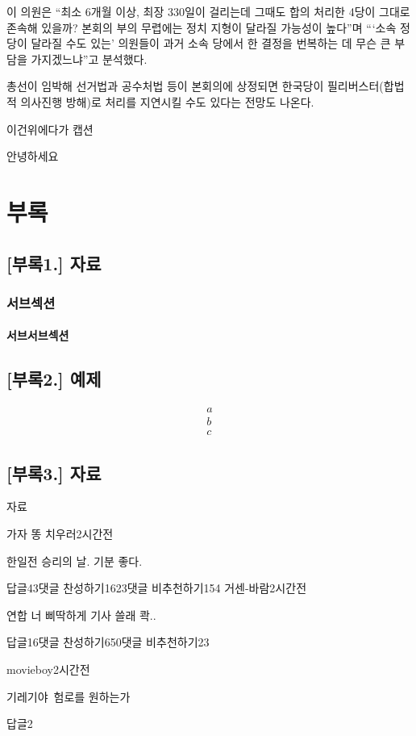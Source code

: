 \documentclass[final,doctor,korean,pdfdoc]{konkukthesis}
\begin{document}
이 의원은 ``최소 6개월 이상, 최장 330일이 걸리는데 그때도 합의 처리한 4당이 그대로 존속해 있을까? 본회의 부의 무렵에는 정치 지형이 달라질 가능성이 높다''며 ```소속 정당이 달라질 수도 있는' 의원들이 과거 소속 당에서 한 결정을 번복하는 데 무슨 큰 부담을 가지겠느냐''고 분석했다.

총선이 임박해 선거법과 공수처법 등이 본회의에 상정되면 한국당이 필리버스터(합법적 의사진행 방해)로 처리를 지연시킬 수도 있다는 전망도 나온다.
\begin{table}
 \caption{이건위에다가 캡션}
 안녕하세요 
\end{table}

\clearpage






\clearpage
\back
\chapter{부록}
\section{[부록1.] 자료}
\subsection{서브섹션}
\subsubsection{서브서브섹션}
\section{[부록2.] 예제}
 
\begin{align}
 a
 \\b
 \\c
\end{align}


\section{[부록3.] 자료}
자료
%
\printglossaries
\begin{abstractKor}
\indent
가자 똥 치우러2시간전 \par
한일전 승리의 날. 기분 좋다. \par
답글43댓글 찬성하기1623댓글 비추천하기154 
\textbf{}
거센-바람2시간전 \par
연합 너 삐딱하게 기사 쓸래 콱.. \par
답글16댓글 찬성하기650댓글 비추천하기23 

movieboy2시간전 \par 
기레기야\, 험로를 원하는가 \par 
답글2
\end{abstractKor}
\end{document}
